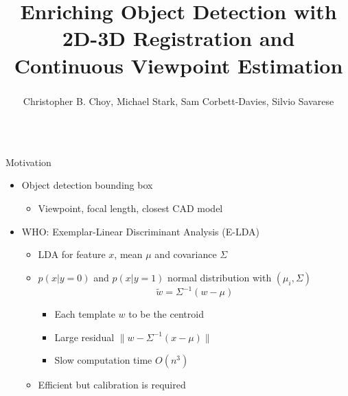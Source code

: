 \documentclass[serif,mathserif,final]{beamer}
\title{Enriching Object Detection with 2D-3D Registration and Continuous
  Viewpoint Estimation}
\author{Christopher B. Choy\textsuperscript{\dag}, Michael
  Stark\textsuperscript{\ddag}, Sam Corbett-Davies\textsuperscript{\dag},
  Silvio Savarese\textsuperscript{\dag}}
\institute{\textsuperscript{\dag}Stanford University,
  \textsuperscript{\ddag}Max Planck Institute for Informatics}
\newcommand{\1}{\mathbb{I}} %
\begin{document}
\begin{frame}{}
  \begin{columns}[t]

    \begin{column}{0.24\linewidth}


      \begin{block}{Motivation}
        \begin{itemize}
          \item Object detection bounding box
            \begin{itemize}
              \item Viewpoint, focal length, closest CAD model
            \end{itemize}
          \item WHO: Exemplar-Linear Discriminant Analysis (E-LDA)
            \begin{itemize}
              \item LDA for feature $x$, mean $\mu$ and covariance $\Sigma$
              \item $p(x | y = 0)$ and $p(x | y = 1)$ normal distribution with $(\mu_i, \Sigma)$
              \begin{equation}
                \tilde{w} = \Sigma^{-1}(w - \mu)
              \end{equation}
                \vspace{-1em}
                \begin{itemize}
                  \item Each template $w$ to be the centroid
                  \item Large residual $\| w - \Sigma^{-1}(x - \mu) \|$
                  \item Slow computation time $O(n^3)$
                \end{itemize}
              \item Efficient but {\color{red} calibration is required}
            \end{itemize}
        \end{itemize}
      \end{block}



\end{column}
\end{columns}
\end{frame}
\end{document}
